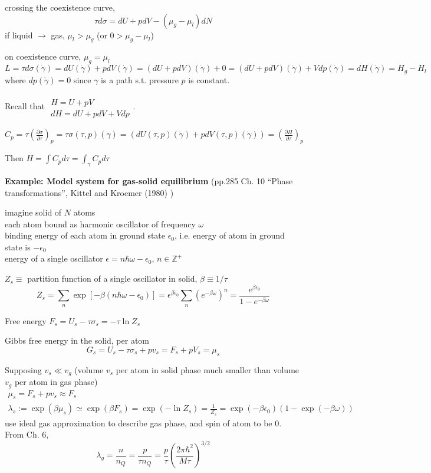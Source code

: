 crossing the coexistence curve,
\[
\tau d\sigma = dU + pdV - (\mu_g - \mu_l) dN
\]
if liquid $\to$ gas, $\mu_l > \mu_g$ (or $0 > \mu_g - \mu_l$)

on coexistence curve, $\mu_g = \mu_l$
\[
L = \tau d\sigma(\dot{\gamma}) = dU(\dot{\gamma}) + pdV(\dot{\gamma}) = (dU+ pdV)(\dot{\gamma}) + 0 = (dU + pdV)(\dot{\gamma}) + Vdp(\dot{\gamma}) = dH(\dot{\gamma}) = H_g -H_l
\]
where $dp(\dot{\gamma}) = 0$ since $\gamma$ is a path s.t. pressure $p$ is constant.  

Recall that $\begin{gathered} \quad \\
  H = U + pV \\
  dH = dU+ pdV + Vdp \end{gathered}$.  


$C_p = \tau \left( \frac{ \partial \sigma }{ \partial \tau} \right)_p = \tau\sigma(\tau,p)(\dot{\gamma}) = (dU(\tau,p)(\dot{\gamma}) + pdV(\tau,p)(\dot{\gamma}) ) = \left( \frac{ \partial H}{ \partial \tau} \right)_p$

Then $H = \int C_p d\tau = \int_{\gamma} C_p d\tau$

\textbf{Example: Model system for gas-solid equilibrium} (pp.285 Ch. 10 ``Phase transformations'', Kittel and Kroemer (1980) \cite{CKittelHKroemer1980})

imagine solid of $N$ atoms \\
each atom bound as harmonic oscillator of frequency $\omega$ \\
binding energy of each atom in ground state $\epsilon_0$, i.e. energy of atom in ground state is $-\epsilon_0$ \\
energy of a single oscillator $\epsilon = n\hbar \omega - \epsilon_0$, $n\in \mathbb{Z}^+$ 

$Z_s \equiv $ partition function of a single oscillator in solid, $\beta \equiv 1/\tau$
\[
Z_s = \sum_n \exp{ [ -\beta (n\hbar \omega - \epsilon_0) ]} = \epsilon^{\beta \epsilon_0} \sum_n (e^{-\beta \omega} )^n = \frac{ e^{\beta \epsilon_0}}{ 1 - e^{-\beta \omega }}
\]

Free energy $F_s = U_s - \tau \sigma_s = -\tau \ln{Z_s}$

Gibbs free energy in the solid, per atom 
\[
G_s = U_s - \tau \sigma_s + pv_s = F_s + pV_s = \mu_s
\]


Supposing $v_s \ll v_g$ (volume $v_s$ per atom in solid phase much smaller than volume $v_g$ per atom in gas phase)
\[
\begin{gathered}
  \mu_s = F_s + pv_s \approx F_s \\ 
  \lambda_s := \exp{ (\beta \mu_s)} \simeq \exp{ (\beta F_s)} = \exp{ (-\ln{ Z_s }) } = \frac{1}{Z_s} = \exp{ (-\beta \epsilon_0 )} (1- \exp{ (-\beta \omega )} )
\end{gathered}
\]
use ideal gas approximation to describe gas phase, and spin of atom to be $0$.  From Ch. 6,
\[
\lambda_g = \frac{n}{n_Q} = \frac{p}{\tau n_Q} = \frac{p}{\tau} \left( \frac{2\pi \hbar^2 }{ M \tau} \right)^{3/2}
\]

